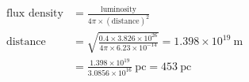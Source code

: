 \begin{align*}
\text{flux density} &= \frac{\text{luminosity}}{4\pi \times (\text{distance})^2}\\
\text{distance} &= \sqrt{\frac{0.4 \times 3.826 \times 10^{26}}{4\pi \times 6.23 \times 10^{-14}}}
  = 1.398 \times 10^{19}~\mathrm{m}\\
&= \frac{1.398 \times 10^{19}}{3.0856 \times 10^{16}}~\mathrm{pc} = 453~\mathrm{pc}
\end{align*}
